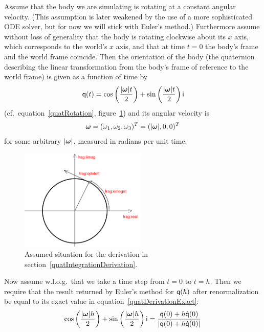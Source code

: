 Assume that the body we are simulating is rotating at a constant angular velocity.
(This assumption is later weakened by the use of a more sophisticated ODE solver,
but for now we will stick with Euler's method.) Furthermore assume without loss of
generality that the body is rotating clockwise about its $x$ axis, which corresponds
to the world's $x$ axis, and that at time $t=0$ the body's frame and the world frame
coincide. Then the orientation of the body (the quaternion describing the linear
transformation from the body's frame of reference to the world frame) is given as a
function of time by
\begin{equation}
\label{quatDerivationExact}
\q{q}(t) = \cos\left(\frac{\norm{\ve{\omega}}t}{2}\right) +
    \sin\left(\frac{\norm{\ve{\omega}}t}{2}\right)\qi
\end{equation}
(cf.\ equation~\ref{quatRotation}, figure~\ref{quatIntFig1}) and its angular velocity is
\begin{equation}
\ve{\omega} = (\omega_1, \omega_2, \omega_3)^T = (\norm{\ve{\omega}}, 0, 0)^T
\end{equation}
for some arbitrary $\norm{\ve{\omega}}$, measured in radians per unit time.

\begin{figure}
\centerline{\includegraphics[width=6cm]{figures/quaternion2}}
\caption{Assumed situation for the derivation in
section~\ref{quatIntegrationDerivation}.\label{quatIntFig1}}
\end{figure}

Now assume w.l.o.g.\ that we take a time step from $t = 0$ to $t = h$.
Then we require that the result returned by Euler's method for $\mathsf{q}(h)$
after renormalization be equal to its exact value in equation~\ref{quatDerivationExact}:
\begin{equation}
\label{quatDerivationSetup}
\cos\left(\frac{\norm{\ve{\omega}} h}{2}\right) +
    \sin\left(\frac{\norm{\ve{\omega}} h}{2}\right)\qi =
    \frac{\q{q}(0) + h \dot{\q{q}}(0)}
        {\norm{\q{q}(0) + h \dot{\q{q}}(0)}}
\end{equation}

